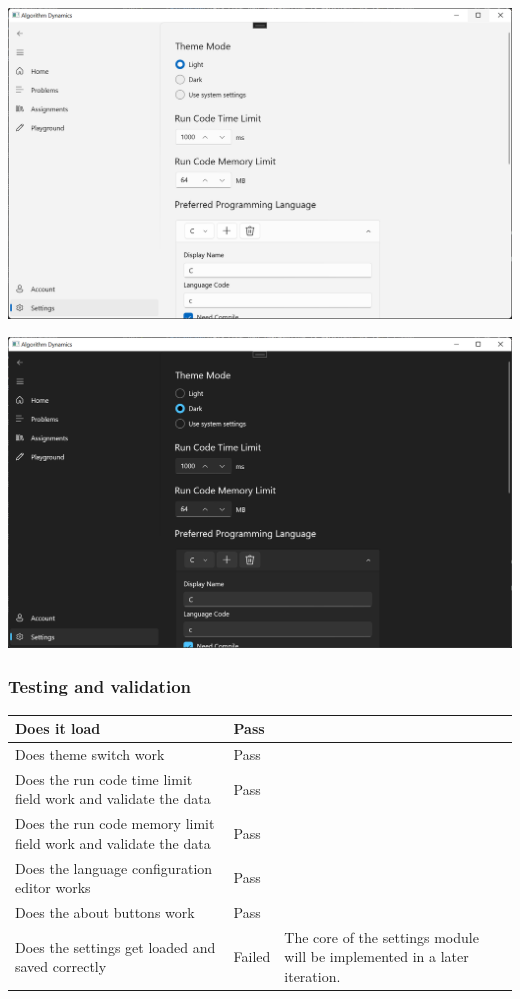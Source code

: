 \documentclass[a4paper]{report}
\begin{document}
\includegraphics[width=\textwidth, height=\textheight, keepaspectratio]{SettingsPage-Light}

\includegraphics[width=\textwidth, height=\textheight, keepaspectratio]{SettingsPage-Dark}

\subsubsection{Testing and validation}

\begin{tabulary}{\linewidth}{|L|l|L|}
    \hline
    Does it load & Pass & \\
    \hline
    Does theme switch work & Pass & \\
    \hline
    Does the run code time limit field work and validate the data & Pass & \\
    \hline
    Does the run code memory limit field work and validate the data & Pass & \\
    \hline
    Does the language configuration editor works & Pass & \\
    \hline
    Does the about buttons work & Pass & \\
    \hline
    Does the settings get loaded and saved correctly & Failed & The core of the settings module will be implemented in a later iteration. \\
    \hline
\end{tabulary}
\end{document}
